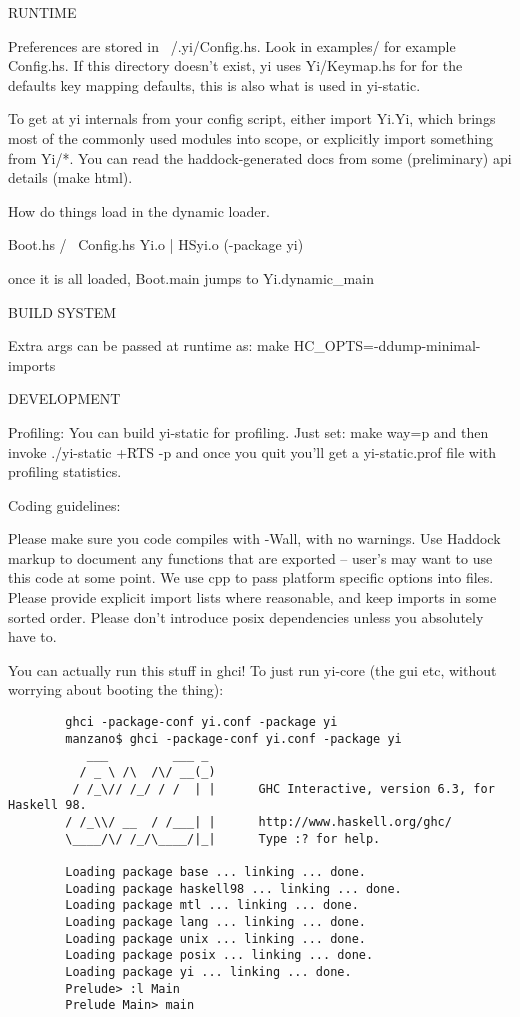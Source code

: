 RUNTIME

Preferences are stored in ~/.yi/Config.hs. Look in examples/ for example
Config.hs. If this directory doesn't exist, yi uses Yi/Keymap.hs for for
the defaults key mapping defaults, this is also what is used in
yi-static.

To get at yi internals from your config script, either import Yi.Yi,
which brings most of the commonly used modules into scope, or explicitly
import something from Yi/*. You can read the haddock-generated docs from
some (preliminary) api details (make html).

How do things load in the dynamic loader.
        
           Boot.hs
          /      \
      Config.hs Yi.o
                  |
                HSyi.o (-package yi)

once it is all loaded, Boot.main jumps to Yi.dynamic\_main

BUILD SYSTEM

Extra args can be passed at runtime as: make HC\_OPTS=-ddump-minimal-imports

DEVELOPMENT

Profiling:
You can build yi-static for profiling. Just set:
	make way=p
and then invoke
	./yi-static +RTS -p
and once you quit you'll get a yi-static.prof file with profiling
statistics.

Coding guidelines:

Please make sure you code compiles with -Wall, with no warnings. Use
Haddock markup to document any functions that are exported -- user's may
want to use this code at some point. We use cpp to pass platform
specific options into files. Please provide explicit import lists where
reasonable, and keep imports in some sorted order.  Please don't
introduce posix dependencies unless you absolutely have to.

You can actually run this stuff in ghci! To just run yi-core (the gui
etc, without worrying about booting the thing):

\begin{verbatim}
        ghci -package-conf yi.conf -package yi
        manzano$ ghci -package-conf yi.conf -package yi
           ___         ___ _
          / _ \ /\  /\/ __(_)
         / /_\// /_/ / /  | |      GHC Interactive, version 6.3, for Haskell 98.
        / /_\\/ __  / /___| |      http://www.haskell.org/ghc/
        \____/\/ /_/\____/|_|      Type :? for help.

        Loading package base ... linking ... done.
        Loading package haskell98 ... linking ... done.
        Loading package mtl ... linking ... done.
        Loading package lang ... linking ... done.
        Loading package unix ... linking ... done.
        Loading package posix ... linking ... done.
        Loading package yi ... linking ... done.
        Prelude> :l Main
        Prelude Main> main
\end{verbatim}


